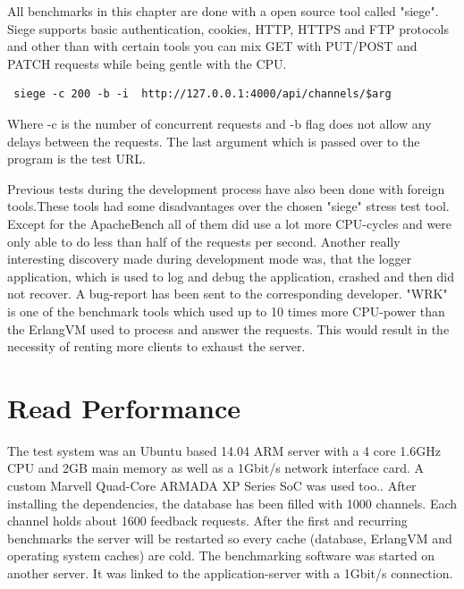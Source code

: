 All benchmarks in this chapter are done with a open source tool called "siege". Siege supports basic authentication, cookies, HTTP, HTTPS and FTP protocols and other than with certain tools you can mix GET with PUT/POST and PATCH requests while being gentle with the CPU.
\begin{verbatim} siege -c 200 -b -i  http://127.0.0.1:4000/api/channels/$arg
\end{verbatim} Where -c is the number of concurrent requests and -b flag does not allow any delays between the requests. The last argument which is passed over to the program is the test URL.

\textcolor{newcode}{
Previous tests during the development process have also been done with foreign tools.These tools had some disadvantages over the chosen "siege" stress test tool. Except for the ApacheBench all of them did use a lot more CPU-cycles and were only able to do less than half of the requests per second. Another really interesting discovery made during development mode was, that the logger application, which is used to log and debug the application, crashed and then did not recover. A bug-report has been sent to the corresponding developer.
"WRK" is one of the benchmark tools which used up to 10 times more CPU-power than the ErlangVM used to process and answer the requests. This would result in the necessity of renting more clients to exhaust the server.  
}

\section{Read Performance} \label{r_perf}
The test system was an Ubuntu based 14.04 ARM server with a 4 core 1.6GHz CPU and 2GB main memory as well as a 1Gbit/s network interface card.  A custom Marvell Quad-Core ARMADA XP Series SoC was used too.\cite{MarArm}.  
After installing the dependencies, the database has been filled with 1000 channels. Each channel holds about 1600 feedback requests. After the first and recurring benchmarks the server will be restarted so every cache (database, ErlangVM and operating system caches) are cold. The benchmarking software was started on another server. It was linked to the application-server with a 1Gbit/s connection.

\lstset{
    frame=nil,
    language=bash,
    keepspaces=true, 
    numbers=left,
    breaklines=true,
    basicstyle=\ttfamily,
}

